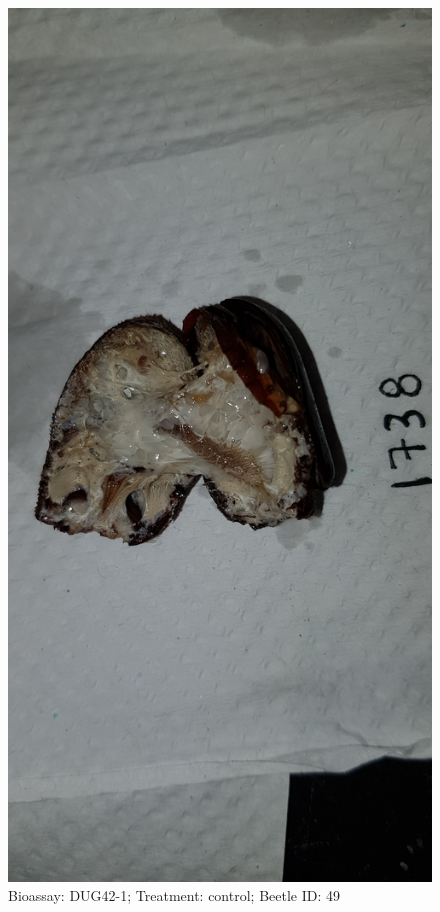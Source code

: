 \documentclass[11pt]{scrartcl}
\begin{document}
\begin{figure}[h!]
    \centering
    \includegraphics[width=\linewidth, height=\textheight, keepaspectratio]{uploads/btl.pm_image.b2c675174fdd2eda.447567343220313733385f5265702d3120636f6e74726f6c2e6a7067.jpg}
    \caption{Bioassay: DUG42-1; Treatment: control; Beetle ID: 49}
\end{figure}
\clearpage
\end{document}
